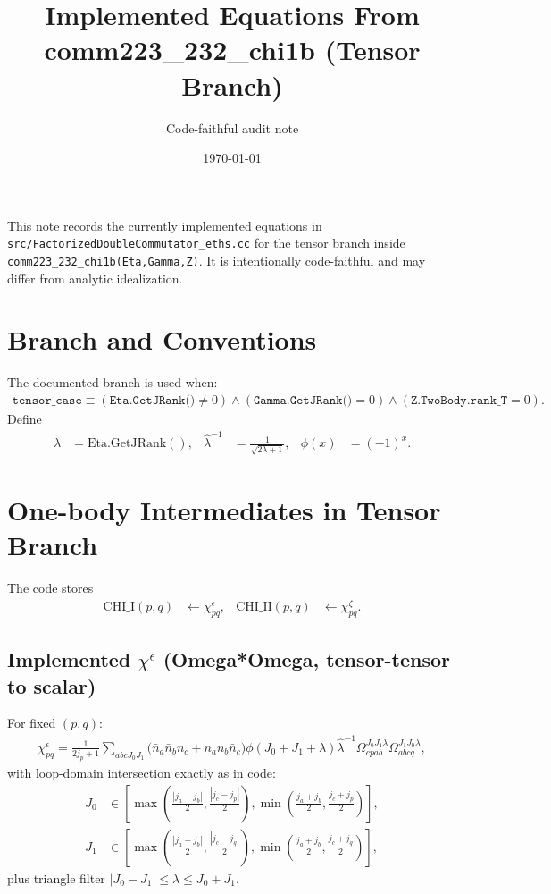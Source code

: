 \documentclass{article}
\title{Implemented Equations From comm223\_232\_chi1b (Tensor Branch)}
\author{Code-faithful audit note}
\date{\today}
\begin{document}
\maketitle

This note records the currently implemented equations in
\texttt{src/FactorizedDoubleCommutator\_eths.cc} for the tensor branch inside
\texttt{comm223\_232\_chi1b(Eta,Gamma,Z)}.
It is intentionally code-faithful and may differ from analytic idealization.

\section*{Branch and Conventions}
The documented branch is used when:
\begin{align}
\texttt{tensor\_case} \equiv (\texttt{Eta.GetJRank()}\neq 0)\land(\texttt{Gamma.GetJRank()}=0)\land(\texttt{Z.TwoBody.rank\_T}=0).
\end{align}
Define
\begin{align}
\lambda &= \mathrm{Eta.GetJRank()},
&
\hat\lambda^{-1} &= \frac{1}{\sqrt{2\lambda+1}},
&
\phi(x) &= (-1)^x.
\end{align}

\section*{One-body Intermediates in Tensor Branch}
The code stores
\begin{align}
\mathrm{CHI\_I}(p,q) &\leftarrow \chi^{\epsilon}_{pq},
&
\mathrm{CHI\_II}(p,q) &\leftarrow \chi^{\zeta}_{pq}.
\end{align}

\subsection*{Implemented $\chi^{\epsilon}$ (Omega*Omega, tensor-tensor to scalar)}
For fixed $(p,q)$:
\begin{align}
\chi^{\epsilon}_{pq}
=\frac{1}{2j_p+1}
\sum_{abcJ_0J_1}
\Big(\bar n_a\bar n_b n_c + n_a n_b\bar n_c\Big)
\phi(J_0+J_1+\lambda)
\hat\lambda^{-1}
\Omega_{cpab}^{J_0J_1\lambda}
\Omega_{abcq}^{J_1J_0\lambda},
\end{align}
with loop-domain intersection exactly as in code:
\begin{align}
J_0 &\in
\left[
\max\!\left(\frac{|j_a-j_b|}{2},\frac{|j_c-j_p|}{2}\right),
\min\!\left(\frac{j_a+j_b}{2},\frac{j_c+j_p}{2}\right)
\right],
\\
J_1 &\in
\left[
\max\!\left(\frac{|j_a-j_b|}{2},\frac{|j_c-j_q|}{2}\right),
\min\!\left(\frac{j_a+j_b}{2},\frac{j_c+j_q}{2}\right)
\right],
\end{align}
plus triangle filter $|J_0-J_1|\le\lambda\le J_0+J_1$.
\end{document}
